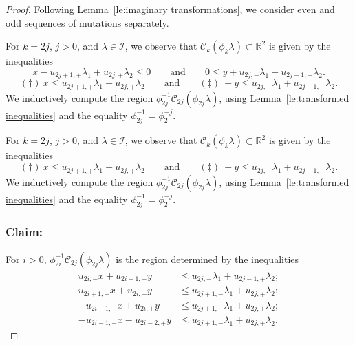 \documentclass{amsart}
\numberwithin{theorem}{section}
\newcommand{\cC}{\mathcal{C}}
\newcommand{\cI}{\mathcal{I}}
\newcommand{\RR}{\mathbb{R}}
\begin{document}
  \begin{proof}
    Following Lemma~\ref{le:imaginary transformations}, we consider even and odd sequences of mutations separately.

    For $k=2j$, $j>0$, and $\lambda\in\cI$, we observe that $\cC_k(\phi_k\lambda)\subset\RR^2$ is given by the inequalities 
    \[ x - u_{2j+1,+}\lambda_1+u_{2j,+}\lambda_2 \le 0 \qquad\text{and}\qquad 0 \le y + u_{2j,-}\lambda_1+u_{2j-1,-}\lambda_2. \]
    \[ (\dagger)\ x\le u_{2j+1,+}\lambda_1+u_{2j,+}\lambda_2 \qquad\text{and}\qquad (\ddagger)\ -y\le u_{2j,-}\lambda_1+u_{2j-1,-}\lambda_2. \]
    We inductively compute the region $\phi_{2j}^{-1}\cC_{2j}(\phi_{2j}\lambda)$, using Lemma~\ref{le:transformed inequalities} and the equality $\phi_{2j}^{-1}=\phi_2^{-j}$.


    For $k=2j$, $j>0$, and $\lambda\in\cI$, we observe that $\cC_k(\phi_k\lambda)\subset\RR^2$ is given by the inequalities 
    \[ (\dagger)\ x\le u_{2j+1,+}\lambda_1+u_{2j,+}\lambda_2 \qquad\text{and}\qquad (\ddagger)\ -y\le u_{2j,-}\lambda_1+u_{2j-1,-}\lambda_2. \]
    We inductively compute the region $\phi_{2j}^{-1}\cC_{2j}(\phi_{2j}\lambda)$, using Lemma~\ref{le:transformed inequalities} and the equality $\phi_{2j}^{-1}=\phi_2^{-j}$.

    \subsubsection*{Claim:} For $i>0$, $\phi_{2i}^{-1}\cC_{2j}(\phi_{2j}\lambda)$ is the region determined by the inequalities 
    \begin{align*}
      \tag{a} u_{2i,-}x+u_{2i-1,+}y &\le u_{2j,-}\lambda_1+u_{2j-1,+}\lambda_2;\\
      \tag{b} u_{2i+1,-}x+u_{2i,+}y &\le u_{2j+1,-}\lambda_1+u_{2j,+}\lambda_2;\\
      \tag{c} -u_{2i-1,-}x+u_{2i,+}y &\le u_{2j+1,-}\lambda_1+u_{2j,+}\lambda_2;\\
      \tag{d} -u_{2i-1,-}x-u_{2i-2,+}y &\le u_{2j+1,-}\lambda_1+u_{2j,+}\lambda_2.
    \end{align*}


\end{proof}
\end{document}
